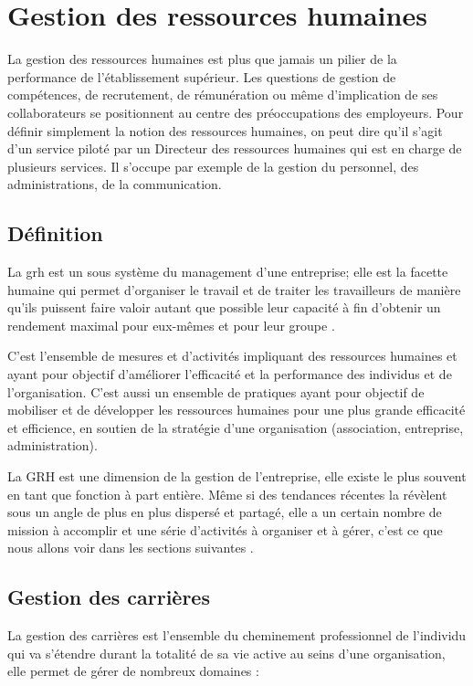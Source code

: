 \section{Gestion des ressources humaines}
La gestion des ressources humaines est plus que jamais un pilier de la performance de l'établissement supérieur. Les questions de gestion de compétences, de recrutement, de rémunération ou même d'implication de ses collaborateurs se positionnent au centre des préoccupations des employeurs. Pour définir simplement la notion des ressources humaines, on peut dire qu'il s'agit d'un service piloté par un Directeur des ressources humaines qui est en charge de plusieurs services. Il s'occupe par exemple de la gestion du personnel, des administrations, de la communication.
\medskip

\subsection{Définition}
La \gls{grh} est un sous système du management d'une entreprise; elle est la facette humaine qui permet d'organiser le travail et de traiter les travailleurs de manière qu'ils puissent faire valoir autant que possible leur capacité à fin d'obtenir un rendement maximal pour eux-mêmes et pour leur groupe \cite{gestionRH}.
\medskip

C'est l'ensemble de mesures et d'activités impliquant des ressources humaines et ayant pour objectif d'améliorer l'efficacité et la performance des individus et de l'organisation. C'est aussi un ensemble de pratiques ayant pour objectif de mobiliser et de développer les ressources humaines pour une plus grande efficacité et efficience, en soutien de la stratégie d'une organisation (association, entreprise, administration).

La GRH est une dimension de la gestion de l'entreprise, elle existe le plus souvent en tant que fonction à part entière.
Même si des tendances récentes la révèlent sous un angle de plus en plus dispersé et partagé, elle a un certain nombre de mission à accomplir et une série d'activités à organiser et à gérer, c'est ce que nous allons voir dans les sections suivantes \cite{gestionRHBook}. 

\subsection{Gestion des carrières}
La gestion des carrières est l'ensemble du cheminement professionnel de l'individu qui va s'étendre durant la totalité de sa vie active au seins d'une organisation, elle permet de gérer de nombreux domaines : 

